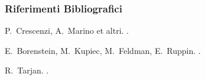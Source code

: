 \documentclass{beamer}
\begin{document}
\begin{frame}%
  \frametitle<presentation>{Riferimenti Bibliografici}
    
  \begin{thebibliography}{10}
    
  \beamertemplatearticlebibitems

    P.~Crescenzi, A.~Marino et altri.
    .

    E.~Borenstein, M.~Kupiec, M.~Feldman, E.~Ruppin.
    .

    R.~Tarjan.
    .

  \end{thebibliography}
\end{frame}
\end{document}
